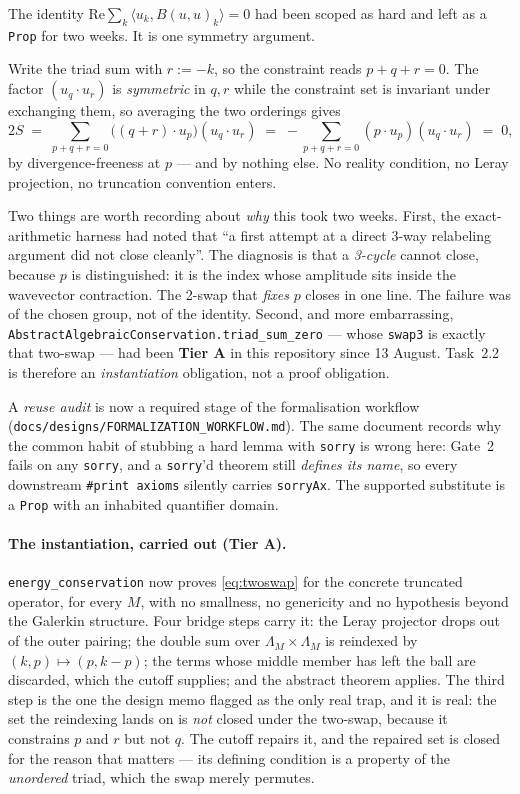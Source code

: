 \documentclass[11pt,a4paper]{article}
\newcommand{\tA}{\textcolor{TierA}{\textbf{Tier A}}}
\theoremstyle{definition}
\theoremstyle{plain}
\begin{document}
The identity $\mathrm{Re}\sum_k\langle u_k,B(u,u)_k\rangle=0$ had been scoped as hard and left as a
\texttt{Prop} for two weeks. It is one symmetry argument.

Write the triad sum with $r:=-k$, so the constraint reads $p+q+r=0$. The factor $(u_q\cdot u_r)$ is
\emph{symmetric} in $q,r$ while the constraint set is invariant under exchanging them, so averaging
the two orderings gives
\begin{equation}
  2S \;=\; \sum_{p+q+r=0}\bigl((q+r)\cdot u_p\bigr)(u_q\cdot u_r)
       \;=\; -\sum_{p+q+r=0}(p\cdot u_p)(u_q\cdot u_r) \;=\; 0,
  \label{eq:twoswap}
\end{equation}
by divergence-freeness at $p$ --- and by nothing else. No reality condition, no Leray projection,
no truncation convention enters.

Two things are worth recording about \emph{why} this took two weeks. First, the exact-arithmetic
harness had noted that ``a first attempt at a direct 3-way relabeling argument did not close
cleanly''. The diagnosis is that a \emph{3-cycle} cannot close, because $p$ is distinguished: it is
the index whose amplitude sits inside the wavevector contraction. The 2-swap that \emph{fixes} $p$
closes in one line. The failure was of the chosen group, not of the identity. Second, and more
embarrassing, \texttt{AbstractAlgebraicConservation.triad\_sum\_zero} --- whose \texttt{swap3} is
exactly that two-swap --- had been \tA{} in this repository since 13 August. Task~2.2 is therefore
an \emph{instantiation} obligation, not a proof obligation.

A \emph{reuse audit} is now a required stage of the formalisation workflow
(\texttt{docs/\allowbreak designs/\allowbreak FORMALIZATION\_WORKFLOW.md}). The same document records why the common habit
of stubbing a hard lemma with \texttt{sorry} is wrong here: Gate~2 fails on any \texttt{sorry}, and
a \texttt{sorry}'d theorem still \emph{defines its name}, so every downstream \texttt{\#print
axioms} silently carries \texttt{sorryAx}. The supported substitute is a \texttt{Prop} with an
inhabited quantifier domain.

\paragraph{The instantiation, carried out (\tA{}).}
\texttt{energy\_conservation} now proves \eqref{eq:twoswap} for the concrete truncated operator, for
every $M$, with no smallness, no genericity and no hypothesis beyond the Galerkin structure. Four
bridge steps carry it: the Leray projector drops out of the outer pairing; the double sum over
$\Lambda_M\times\Lambda_M$ is reindexed by $(k,p)\mapsto(p,k-p)$; the terms whose middle member has
left the ball are discarded, which the cutoff supplies; and the abstract theorem applies. The third
step is the one the design memo flagged as the only real trap, and it is real: the set the
reindexing lands on is \emph{not} closed under the two-swap, because it constrains $p$ and $r$ but
not $q$. The cutoff repairs it, and the repaired set is closed for the reason that matters --- its
defining condition is a property of the \emph{unordered} triad, which the swap merely permutes.
\end{document}
